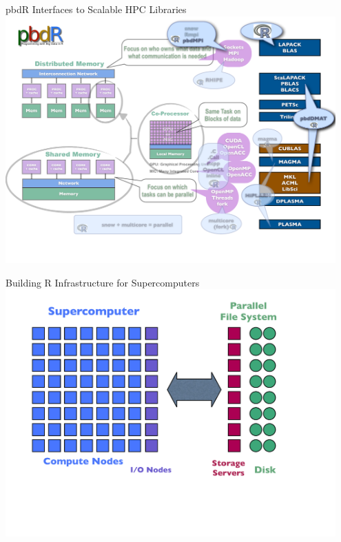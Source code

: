 \begin{frame}
  \begin{block}{pbdR Interfaces to Scalable HPC Libraries}
    \includegraphics[width=0.95\textwidth]{../common/pics/hardware/ParallelHardware13.pdf}
  \end{block}
\end{frame}


\begin{frame}
  \begin{block}{Building R Infrastructure for Supercomputers}
    \includegraphics[width=0.95\textwidth]{../common/pics/hardware/SupercomputerFileSystem.pdf}
  \end{block}
\end{frame}